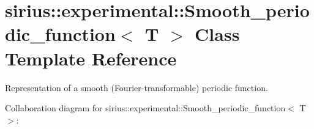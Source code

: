 \hypertarget{classsirius_1_1experimental_1_1_smooth__periodic__function}{}\section{sirius\+:\+:experimental\+:\+:Smooth\+\_\+periodic\+\_\+function$<$ T $>$ Class Template Reference}
\label{classsirius_1_1experimental_1_1_smooth__periodic__function}


Representation of a smooth (Fourier-\/transformable) periodic function.  




Collaboration diagram for sirius\+:\+:experimental\+:\+:Smooth\+\_\+periodic\+\_\+function$<$ T $>$\+:
